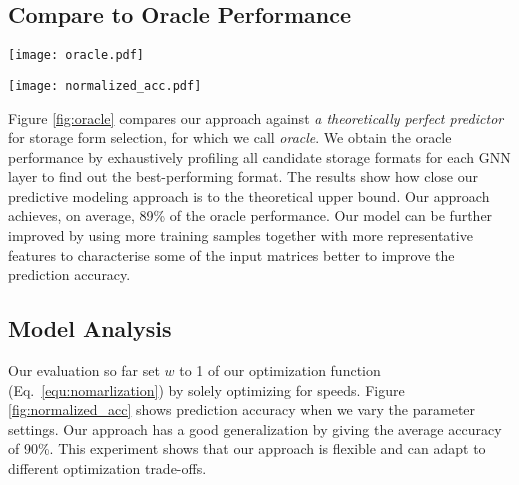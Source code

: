 \subsection{Compare to Oracle Performance\label{sec:oraclp}}
\vspace{-2mm}
\begin{figure*}[t!]

\begin{minipage}[t]{0.5\linewidth}
\texttt{[image: oracle.pdf]}
\vspace{-5mm} \caption{Performance of our approach related to the Oracle performance.} \label{fig:oracle}
\end{minipage}
\begin{minipage}[t]{0.5\linewidth}
\texttt{[image: normalized\_acc.pdf]}
\vspace{-6mm} \caption{Prediction accuracy of our approach when varying $w$ in Eq \ref{equ:nomarlization}. } \label{fig:normalized_acc}
\vspace{-9mm}
\end{minipage}
\vspace{-3mm}
\end{figure*}


Figure \ref{fig:oracle} compares our approach against \emph{a theoretically perfect predictor} for storage form selection, for which we call \emph{oracle}. We obtain the oracle performance by exhaustively profiling all candidate storage formats for each GNN layer to find out the best-performing format. The results show how close our predictive modeling approach is to the theoretical upper bound. Our approach achieves, on average,  89\% of the oracle performance. Our model can be further improved by using more training samples together with more representative features to characterise some of the input matrices better to improve the prediction accuracy.

\vspace{-3mm}
\subsection{Model Analysis\label{sec:optp}}
\vspace{-3mm}  Our evaluation so far set $w$ to 1 of our optimization function
(Eq.~\ref{equ:nomarlization}) by solely optimizing for speeds. Figure \ref{fig:normalized_acc} shows prediction accuracy when we vary the
parameter settings. Our approach has a good generalization by giving the average accuracy of 90\%. This experiment shows that our approach
is flexible and can adapt to different optimization trade-offs.



